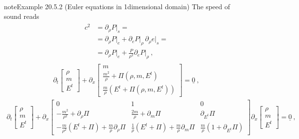 \documentclass[letterpaper,10pt,english]{jupyterBook}
\begin{document}
\begin{sphinxadmonition}{note}{Example 20.5.2 (Euler equations in 1\sphinxhyphen{}dimensional domain)}
\sphinxAtStartPar
The speed of sound reads
\begin{equation*}
\begin{split}\begin{aligned}
  c^2
  & = \partial_\rho P\big|_s = \\
  & = \partial_\rho P\big|_e + \partial_e P\big|_{\rho} \, \partial_\rho e\big|_s = \\
  & = \partial_\rho P\big|_e + \frac{P}{\rho^2} \partial_e P \big|_{\rho} \ ,
\end{aligned}\end{split}
\end{equation*}
\sphinxAtStartPar
{}
\begin{equation*}
\begin{split}\partial_t \begin{bmatrix} \rho \\ m \\ E^t \end{bmatrix} + \partial_x \begin{bmatrix} m \\ \frac{m^2}{\rho} + \Pi(\rho,m,E^t) \\ \frac{m}{\rho} \left(E^t + \Pi(\rho, m, E^t)\right)  \end{bmatrix} = \underline{0} \ ,\end{split}
\end{equation*}
\sphinxAtStartPar
{}
\begin{equation*}
\begin{split}\partial_t \begin{bmatrix} \rho \\ m \\ E^t \end{bmatrix} + \partial_x \begin{bmatrix} 0 & 1 & 0 \\ - \frac{m^2}{\rho^2} + \partial_\rho \Pi & \frac{2 m}{\rho} + \partial_m \Pi & \partial_{E^t} \Pi \\ - \frac{m}{\rho^2}(E^t+\Pi)+ \frac{m}{\rho}\partial_\rho \Pi & \frac{1}{\rho} (E^t + \Pi) + \frac{m}{ \rho} \partial_{m} \Pi & \frac{m}{\rho} \left( 1 + \partial_{E^t} \Pi \right)  \end{bmatrix} \partial_x \begin{bmatrix} \rho \\ m \\ E^t \end{bmatrix}  = \underline{0} \ ,\end{split}

\end{equation*}
\end{sphinxadmonition}
\end{document}
